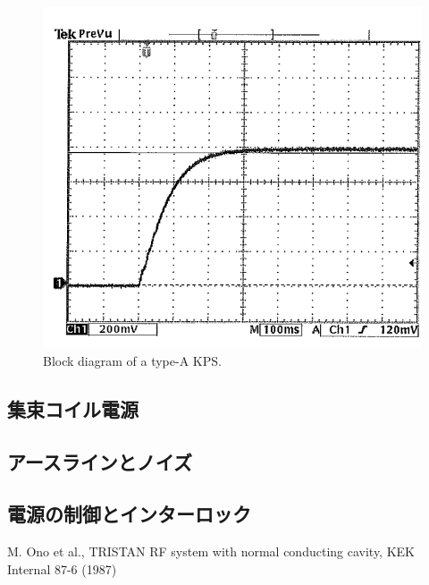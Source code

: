 \documentclass[book,openany]{jlreq}
\theoremstyle{definition}
\begin{document}
\begin{figure}[!htt]
    \begin{center}
        \includegraphics[width=12cm,clip]{figs/anode_rise.png}
        \caption{Block diagram of a type-A KPS.}
        \label{anode}
    \end{center}
\end{figure}

\subsection{集束コイル電源}

\subsection{アースラインとノイズ}
\subsection{電源の制御とインターロック}

\begin{thebibliography}{9}
    M. Ono et al., TRISTAN RF system with normal conducting cavity, KEK Internal 87-6 (1987)
\end{thebibliography}
%
\end{document}
